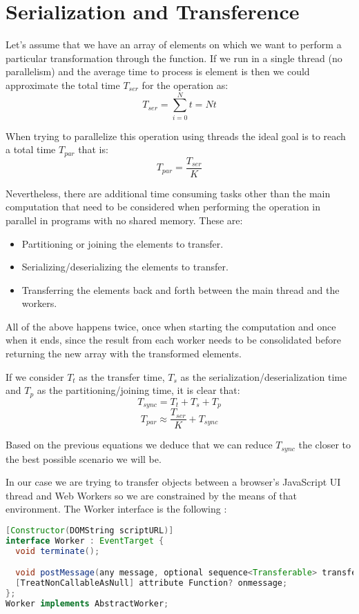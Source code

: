 \section{Serialization and Transference}
\label{sec:serialization-and-transference}

Let's assume that we have an array of  elements on which we want to perform a particular transformation through the  function. If we run in a single thread (no parallelism) and the average time to process is element is  then we could approximate the total time \(T_{ser}\) for the operation as:
\[T_{ser} = \sum_{i = 0}^{N}t = Nt\]

When trying to parallelize this operation using  threads the ideal goal is to reach a total time \(T_{par}\) that is:
\[T_{par} = \frac{T_{ser}}{K}\]

Nevertheless, there are additional time consuming tasks other than the main computation that need to be considered when performing the operation in parallel in programs with no shared memory. These are:
\begin{itemize}
  \item Partitioning or joining the elements to transfer.
  \item Serializing/deserializing the elements to transfer.
  \item Transferring the elements back and forth between the main thread and the workers.
\end{itemize}

All of the above happens twice, once when starting the computation and once when it ends, since the result from each worker needs to be consolidated before returning the new array with the transformed elements.

If we consider \(T_{t}\) as the transfer time, \(T_{s}\) as the serialization/deserialization time and \(T_{p}\) as the partitioning/joining time, it is clear that:
\[T_{sync} = T_{t} + T_{s} + T_{p}\]
\[T_{par} \approx \frac{T_{ser}}{K} + T_{sync}\]

Based on the previous equations we deduce that we can reduce \(T_{sync}\) the closer to the best possible scenario we will be.

In our case we are trying to transfer objects between a browser's JavaScript UI thread and Web Workers so we are constrained by the means of that environment. The Worker interface is the following \cite{w3c-ww}:
\begin{lstlisting}[language=Java, caption=The Worker interface]
[Constructor(DOMString scriptURL)]
interface Worker : EventTarget {
  void terminate();

  void postMessage(any message, optional sequence<Transferable> transfer);
  [TreatNonCallableAsNull] attribute Function? onmessage;
};
Worker implements AbstractWorker;
\end{lstlisting}

